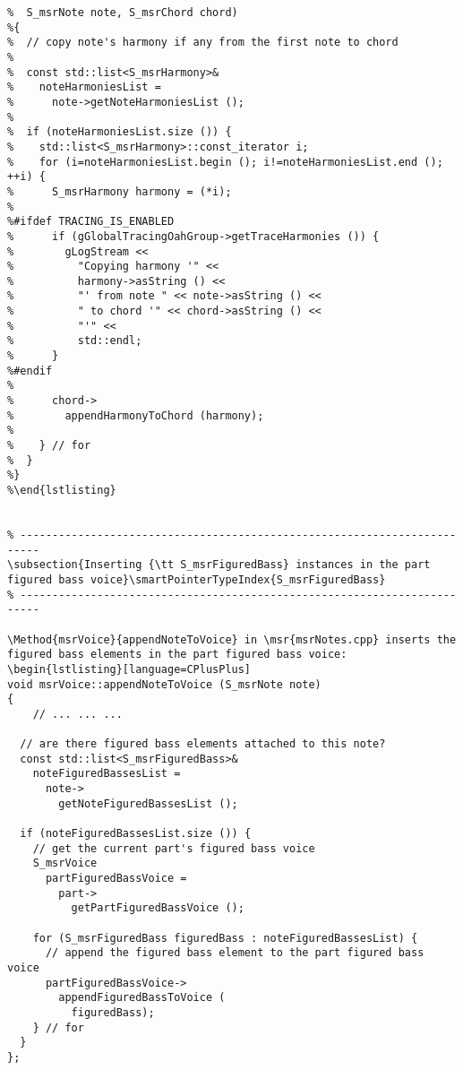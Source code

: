 %
\begin{lstlisting}[language=CPlusPlus]
%void mxsr2msrTranslator::copyNoteHarmoniesToChord (
%  S_msrNote note, S_msrChord chord)
%{
%  // copy note's harmony if any from the first note to chord
%
%  const std::list<S_msrHarmony>&
%    noteHarmoniesList =
%      note->getNoteHarmoniesList ();
%
%  if (noteHarmoniesList.size ()) {
%    std::list<S_msrHarmony>::const_iterator i;
%    for (i=noteHarmoniesList.begin (); i!=noteHarmoniesList.end (); ++i) {
%      S_msrHarmony harmony = (*i);
%
%#ifdef TRACING_IS_ENABLED
%      if (gGlobalTracingOahGroup->getTraceHarmonies ()) {
%        gLogStream <<
%          "Copying harmony '" <<
%          harmony->asString () <<
%          "' from note " << note->asString () <<
%          " to chord '" << chord->asString () <<
%          "'" <<
%          std::endl;
%      }
%#endif
%
%      chord->
%        appendHarmonyToChord (harmony);
%
%    } // for
%  }
%}
%\end{lstlisting}


\subsection{Inserting {\tt S_msrFiguredBass} instances in the part figured bass voice}\smartPointerTypeIndex{S_msrFiguredBass}

\Method{msrVoice}{appendNoteToVoice} in \msr{msrNotes.cpp} inserts the figured bass elements in the part figured bass voice:
\begin{lstlisting}[language=CPlusPlus]
void msrVoice::appendNoteToVoice (S_msrNote note)
{
	// ... ... ...

  // are there figured bass elements attached to this note?
  const std::list<S_msrFiguredBass>&
    noteFiguredBassesList =
      note->
        getNoteFiguredBassesList ();

  if (noteFiguredBassesList.size ()) {
    // get the current part's figured bass voice
    S_msrVoice
      partFiguredBassVoice =
        part->
          getPartFiguredBassVoice ();

    for (S_msrFiguredBass figuredBass : noteFiguredBassesList) {
      // append the figured bass element to the part figured bass voice
      partFiguredBassVoice->
        appendFiguredBassToVoice (
          figuredBass);
    } // for
  }
};
\end{lstlisting}


